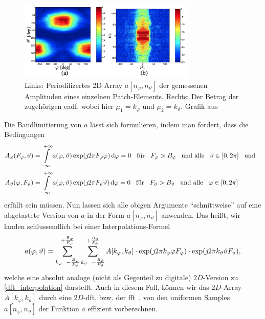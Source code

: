 \begin{figure}[t]
    \centering\includegraphics[width=0.75\textwidth]{img/eadf/bp_aperture.png}
    \caption{Links: Periodifizertes 2D Array $a[n_\varphi, n_\vartheta]$ der gemessenen Amplituden eines einzelnen Patch-Elements. Rechts: Der Betrag der zugeh\"origen \gls{eadf}, wobei hier $\mu_1 = k_\varphi$ und $\mu_2 = k_\vartheta$. Grafik aus~\cite{landmann2004EADF}}\label{eadf_bp_aperture}
\end{figure}

Die Bandlimitierung von $a$ l\"asst sich formulieren, indem man fordert, dass die Bedingungen
\begin{align}
    A_{\varphi}(F_\varphi, \vartheta) 
    &= {\int\limits_{-\infty}^{+\infty}{
        a(\varphi, \vartheta) \exp(\jmath 2 \pi F_\varphi \varphi)
    }\,\mathrm{d}{\varphi}} = 0 
    {\hspace{3mm} \text{f\"ur} \hspace{3mm}} F_\varphi > B_\varphi {\hspace{3mm} \text{und alle} \hspace{3mm}} \vartheta \in [0, 2 \pi] {\hspace{3mm} \text{und} \hspace{3mm}} \\
    A_{\vartheta}(\varphi, F_\vartheta) 
    &= {\int\limits_{-\infty}^{+\infty}{
        a(\varphi, \vartheta) \exp(\jmath 2 \pi F_\vartheta \vartheta)
    }\,\mathrm{d}{\varphi}} = 0 
    {\hspace{3mm} \text{f\"ur} \hspace{3mm}} F_\vartheta > B_\vartheta {\hspace{3mm} \text{und alle} \hspace{3mm}} \varphi \in [0, 2 \pi]
\end{align}
erf\"ullt sein m\"ussen. Nun lassen sich alle obigen Argumente ``schnittweise'' auf eine abgetastete Version von $a$ in der Form $a[n_\varphi, n_\vartheta]$ anwenden. Das hei{\ss}t, wir landen schlussendlich bei einer Interpolations-Formel
\begin{equation}\label{2d_dft_interpolation}
    a(\varphi, \vartheta) = {\sum\limits_{k_\varphi=-\frac{B_\varphi}{F_\varphi}}^{+\frac{B_\varphi}{F_\varphi}}{
        {\sum\limits_{k_\vartheta=-\frac{B_\vartheta}{F_\vartheta}}^{+\frac{B_\vartheta}{F_\vartheta}}{
            A[k_\varphi, k_\vartheta] 
            \cdot \exp(\jmath 2 \pi k_\varphi \varphi F_\varphi)
            \cdot \exp(\jmath 2 \pi k_\vartheta \vartheta F_\vartheta)
        }}
    }},
\end{equation}
welche eine absolut analoge (nicht als Gegenteil zu digitale) $2D$-Version zu \eqref{dft_interpolation} darstellt. Auch in diesem Fall, k\"onnen wir das $2D$-Array $A[k_\varphi, k_\vartheta]$ durch eine $2D$-\gls{dft}, bzw. der \gls{fft}~\cite{FFTW05}, von den uniformen Samples $a[n_\varphi, n_\vartheta]$ der Funktion $a$ effizient vorberechnen.

